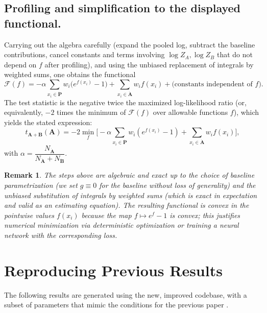 \documentclass{article}
\newtheorem{remark}[theorem]{Remark}
\newcommand{\dataset}[1]{{\mathbf{#1}}}         %
\newcommand{\reco}[1]{{\dataset{\dot{#1}}}}     %
\begin{document}
\subsection{Profiling and simplification to the displayed functional.}
Carrying out the algebra carefully (expand the pooled log, subtract the baseline contributions, cancel constants and terms involving \(\log Z_A,\log Z_B\) that do not depend on \(f\) after profiling), and using the unbiased replacement of integrals by weighted sums, one obtains the functional
\[
\mathcal{F}(f) = -\alpha \sum_{x_i\in\reco{P}} w_i\big(e^{f(x_i)}-1\big) + \sum_{x_i\in\reco{A}} w_i f(x_i) + \text{(constants independent of $f$)}.
\]
The test statistic is the negative twice the maximized log-likelihood ratio (or, equivalently, \(-2\) times the minimum of \(\mathcal{F}(f)\) over allowable functions \(f\)), which yields the stated expression:
\[
t_{\dataset{A}+\dataset{B}}(\dataset{A}) = -2 \min_f \Big[ -\alpha \sum_{x_i\in\reco{P}} w_i (e^{f(x_i)}-1) + \sum_{x_i\in\reco{A}} w_i f(x_i) \Big],
\]
with \(\alpha=\dfrac{N_\reco{A}}{N_\reco{A}+N_\reco{B}}\).

\begin{remark}
    \textup{The steps above are algebraic and exact up to the choice of baseline parametrization (we set \(g\equiv 0\) for the baseline without loss of generality) and the unbiased substitution of integrals by weighted sums (which is exact in expectation and valid as an estimating equation). The resulting functional is convex in the pointwise values \(f(x_i)\) because the map \(f\mapsto e^{f}-1\) is convex; this justifies numerical minimization via deterministic optimization or training a neural network with the corresponding loss.}
\end{remark}



\section{Reproducing Previous Results}

The following results are generated using the new, improved codebase, with a subset of parameters that mimic the conditions for the previous paper \cite{LastDDPPaper}.





\end{document}
